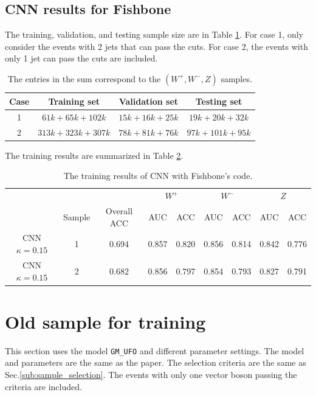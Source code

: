 \documentclass[12pt]{article}
\begin{document}
	\subsection{CNN results for Fishbone}%
	\label{sub:cnn_results_for_fishbone}
		The training, validation, and testing sample size are in Table \ref{tab:CNN_sample_size_fish}. For case 1, only consider the events with 2 jets that can pass the cuts. For case 2, the events with only 1 jet can pass the cuts are included. 
		\begin{table}[htpb]
			\centering
			\caption{The entries in the sum correspond to the $(W^{+}, W^{-}, Z)$ samples.}
			\label{tab:CNN_sample_size_fish}
			\begin{tabular}{c|c|c|c}
			Case & Training set     & Validation set & Testing set   \\ \hline
			1    & $61k+65k+102k$ & $15k+16k+25k$ & $19k+20k+32k$\\
			2    & $313k+323k+307k$ & $78k+81k+76k$ & $97k+101k+95k$ \\
			\end{tabular}
		\end{table}
		The training results are summarized in Table \ref{tab:CNN_training_result_fish}.
		\begin{table}[htpb]
			\centering
			\caption{The training results of CNN with Fishbone's code.}
			\label{tab:CNN_training_result_fish}
			\begin{tabular}{c|c|c|cc|cc|cc}
								  &					  &             & \multicolumn{2}{c|}{$W^{+}$} & \multicolumn{2}{c|}{$W^{-}$} & \multicolumn{2}{c}{$Z$} \\
								  & Sample			  & Overall ACC & AUC        & ACC       & AUC        & ACC       & AUC       & ACC       \\ \hline
				CNN $\kappa=0.15$ & \multirow{1}{*}{1}& 0.694 & 0.857 & 0.820 & 0.856 & 0.814 & 0.842 & 0.776 \\
				CNN $\kappa=0.15$ & \multirow{1}{*}{2}& 0.682 & 0.856 & 0.797 & 0.854 & 0.793 & 0.827 & 0.791 \\
			\end{tabular}
		\end{table}

\section{Old sample for training}%
\label{sec:old_sample_for_training}
	This section uses the model \verb+GM_UFO+ and different parameter settings. The model and parameters are the same as the paper. The selection criteria are the same as Sec.\ref{sub:sample_selection}. The events with only one vector boson passing the criteria are included.
\end{document}
